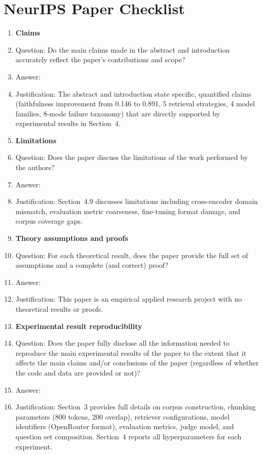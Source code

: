 \section*{NeurIPS Paper Checklist}

\begin{enumerate}

\item {\bf Claims}
    \item[] Question: Do the main claims made in the abstract and introduction accurately reflect the paper's contributions and scope?
    \item[] Answer: \answerYes{}
    \item[] Justification: The abstract and introduction state specific, quantified claims (faithfulness improvement from 0.146 to 0.891, 5 retrieval strategies, 4 model families, 8-mode failure taxonomy) that are directly supported by experimental results in Section~4.

\item {\bf Limitations}
    \item[] Question: Does the paper discuss the limitations of the work performed by the authors?
    \item[] Answer: \answerYes{}
    \item[] Justification: Section~4.9 discusses limitations including cross-encoder domain mismatch, evaluation metric coarseness, fine-tuning format damage, and corpus coverage gaps.

\item {\bf Theory assumptions and proofs}
    \item[] Question: For each theoretical result, does the paper provide the full set of assumptions and a complete (and correct) proof?
    \item[] Answer: \answerNA{}
    \item[] Justification: This paper is an empirical applied research project with no theoretical results or proofs.

    \item {\bf Experimental result reproducibility}
    \item[] Question: Does the paper fully disclose all the information needed to reproduce the main experimental results of the paper to the extent that it affects the main claims and/or conclusions of the paper (regardless of whether the code and data are provided or not)?
    \item[] Answer: \answerYes{}
    \item[] Justification: Section~3 provides full details on corpus construction, chunking parameters (800 tokens, 200 overlap), retriever configurations, model identifiers (OpenRouter format), evaluation metrics, judge model, and question set composition. Section~4 reports all hyperparameters for each experiment.


\end{enumerate}
